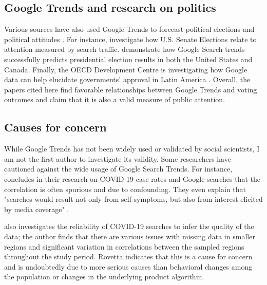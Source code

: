 \subsection{Google Trends and research on politics}

Various sources have also used Google Trends to forecast
political elections and political attitudes
\citep{wolfTrendingRightDirection2018}. For instance,
\citet{swearingenGoogleInsightsSenate2014} investigate how U.S. Senate
Elections relate to attention measured by search traffic.
\citet{pradoromanGoogleTrendsPredictor2020} demonstrate how Google Search trends
successfully predicts presidential election results in both the United
States and Canada. Finally, the OECD Development Centre is investigating
how Google data can help elucidate governments' approval in Latin
America \citep{montoyaUsingGoogleData2020}. Overall, the papers 
cited here find favorable relationships between Google Trends and
voting outcomes and claim that it is also a valid measure of public attention. 

\subsection{Causes for concern}

While Google Trends has not been widely used or validated by social scientists,
I am not the first author to investigate its validity.
Some researchers have cautioned against the wide usage of Google Search Trends. For instance, \citet{asseoTrackingCOVID19Using2020} 
concludes in their research on COVID-19 case rates and Google searches that the correlation 
is often spurious and due to confounding. They even explain that "searches would
result not only from self-symptoms, but also from interest elicited by
media coverage" \citep[][p.1]{asseoTrackingCOVID19Using2020}.

\citet{rovetta21} also investigates the reliability of COVID-19 searches to infer 
the quality of the data; the author finds that there are various issues with missing data in 
smaller regions and significant variation in correlations between the sampled regions throughout
the study period. Rovetta indicates that this is a cause for concern and is undoubtedly due to more 
serious causes than behavioral changes among the population or changes in the underlying product algorithm. 

